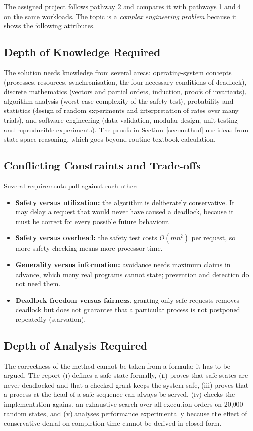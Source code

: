 \documentclass[11pt,a4paper]{report}
\begin{document}
The assigned project follows pathway 2 and compares it with pathways 1 and 4 on the same workloads. The topic is a \emph{complex engineering problem} because it shows the following attributes.

\subsection{Depth of Knowledge Required}
The solution needs knowledge from several areas: operating-system concepts (processes, resources, synchronisation, the four necessary conditions of deadlock), discrete mathematics (vectors and partial orders, induction, proofs of invariants), algorithm analysis (worst-case complexity of the safety test), probability and statistics (design of random experiments and interpretation of rates over many trials), and software engineering (data validation, modular design, unit testing and reproducible experiments). The proofs in Section~\ref{sec:method} use ideas from state-space reasoning, which goes beyond routine textbook calculation.

\subsection{Conflicting Constraints and Trade-offs}
Several requirements pull against each other:
\begin{itemize}
    \item \textbf{Safety versus utilization:} the algorithm is deliberately conservative. It may delay a request that would never have caused a deadlock, because it must be correct for every possible future behaviour.
    \item \textbf{Safety versus overhead:} the safety test costs $O(mn^2)$ per request, so more safety checking means more processor time.
    \item \textbf{Generality versus information:} avoidance needs maximum claims in advance, which many real programs cannot state; prevention and detection do not need them.
    \item \textbf{Deadlock freedom versus fairness:} granting only safe requests removes deadlock but does not guarantee that a particular process is not postponed repeatedly (starvation).
\end{itemize}

\subsection{Depth of Analysis Required}
The correctness of the method cannot be taken from a formula; it has to be argued. The report (i) defines a safe state formally, (ii) proves that safe states are never deadlocked and that a checked grant keeps the system safe, (iii) proves that a process at the head of a safe sequence can always be served, (iv) checks the implementation against an exhaustive search over all execution orders on 20{,}000 random states, and (v) analyses performance experimentally because the effect of conservative denial on completion time cannot be derived in closed form.
\end{document}

